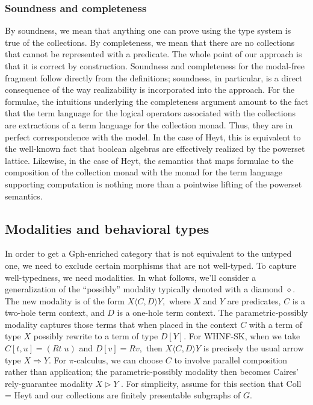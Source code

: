 \documentclass[submission,copyright,creativecommons]{eptcs}
\newcommand{\pic}{$\pi\mbox{-calculus}$\xspace}
\begin{document}
\subsubsection{Soundness and completeness}
By soundness, we mean that anything one can prove using the type system is true of the collections.  By completeness, we mean that there are no collections that cannot be represented with a predicate.  The whole point of our approach is that it is correct by construction.  Soundness and completeness for the modal-free fragment follow directly from the definitions; soundness, in particular, is a direct consequence of the way realizability is incorporated into the approach.  For the formulae, the intuitions underlying the completeness argument amount to the fact that the term language for the logical operators associated with the collections are extractions of a term language for the collection monad.  Thus, they are in perfect correspondence with the model.  In the case of Heyt, this is equivalent to the well-known fact that boolean algebras are effectively realized by the powerset lattice.  Likewise, in the case of Heyt, the semantics that maps formulae to the composition of the collection monad with the monad for the term language supporting computation is nothing more than a pointwise lifting of the powerset semantics.   

\subsection{Modalities and behavioral types}

In order to get a Gph-enriched category that is not equivalent to the untyped one, we need to exclude certain morphisms that are not well-typed.  To capture well-typedness, we need modalities.  In what follows, we'll consider a generalization of the ``possibly'' modality typically denoted with a diamond $\diamond.$  The new modality is of the form $X\langle C, D \rangle Y,$ where $X$ and $Y$ are predicates, $C$ is a two-hole term context, and $D$ is a one-hole term context.  The parametric-possibly modality captures those terms that when placed in the context $C$ with a term of type $X$ possibly rewrite to a term of type $D[Y].$  For WHNF-SK, when we take $C[t,u] = (Rt\; u)$ and $D[v] = Rv,$ then $X\langle C, D \rangle Y$ is precisely the usual arrow type $X \Rightarrow Y.$  For \pic, we can choose $C$ to involve parallel composition rather than application; the parametric-possibly modality then becomes Caires' rely-guarantee modality $X \triangleright Y$ \cite{Caires}.  For simplicity, assume for this section that Coll = Heyt and our collections are finitely presentable subgraphs of $G.$
\end{document}
